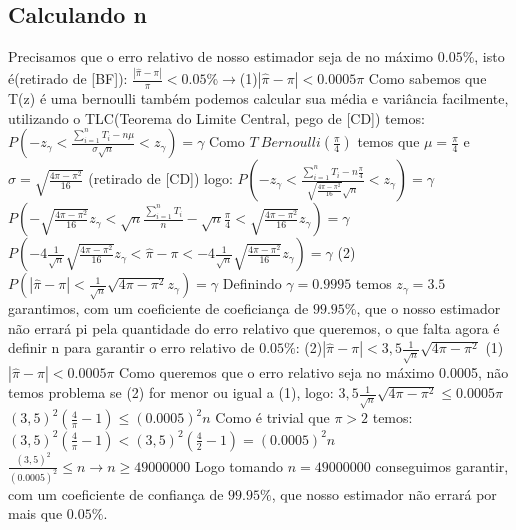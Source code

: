 \documentclass{article}
\begin{document}
\subsection{Calculando n}
Precisamos que o erro relativo de nosso estimador seja de no máximo $0.05\%$, isto é(retirado de [BF]):
\newline
$\frac{|\hat{\pi}-\pi|}{\pi}<0.05\%\rightarrow$(1)$|\hat{\pi}-\pi|<0.0005\pi$
\newline
Como sabemos que T(z) é uma bernoulli também podemos calcular sua média e variância facilmente, utilizando o TLC(Teorema do Limite Central, pego de [CD]) temos:
\newline
$P(-z_\gamma<\frac{\sum_{i=1}^{n}T_i-n\mu}{\sigma\sqrt{n}}<z_\gamma)=\gamma$
\newline
Como $T~Bernoulli(\frac{\pi}{4})$ temos que $\mu=\frac{\pi}{4}$ e $\sigma=\sqrt{\frac{4\pi-\pi^2}{16}}$ (retirado de [CD]) logo:
\newline
$P(-z_\gamma<\frac{\sum_{i=1}^{n}T_i-n\frac{\pi}{4}}{\sqrt{\frac{4\pi-\pi^2}{16}}\sqrt{n}}<z_\gamma)=\gamma$
\newline
$P(-\sqrt{\frac{4\pi-\pi^2}{16}}z_\gamma<\sqrt{n}\frac{\sum_{i=1}^{n}T_i}{n}-\sqrt{n}\frac{\pi}{4}<\sqrt{\frac{4\pi-\pi^2}{16}}z_\gamma)=\gamma$
\newline
$P(-4\frac{1}{\sqrt{n}}\sqrt{\frac{4\pi-\pi^2}{16}}z_\gamma<\hat{\pi}-\pi<-4\frac{1}{\sqrt{n}}\sqrt{\frac{4\pi-\pi^2}{16}}z_\gamma)=\gamma$
\newline
(2)$P(|\hat{\pi}-\pi|<\frac{1}{\sqrt{n}}\sqrt{4\pi-\pi^2}z_\gamma)=\gamma$
\newline
Definindo $\gamma=0.9995$ temos $z_\gamma=3.5$ garantimos, com um coeficiente de coeficiança de $99.95\%$, que o nosso estimador não errará pi pela quantidade do erro relativo que queremos, o que falta agora é definir n para garantir o erro relativo de $0.05\%$:
\newline
(2)$|\hat{\pi}-\pi|<3,5\frac{1}{\sqrt{n}}\sqrt{4\pi-\pi^2}$
\newline
(1)$|\hat{\pi}-\pi|<0.0005\pi$
\newline
Como queremos que o erro relativo seja no máximo 0.0005, não temos problema se (2) for menor ou igual a (1), logo:
\newline
$3,5\frac{1}{\sqrt{n}}\sqrt{4\pi-\pi^2}\le0.0005\pi$
\newline
$(3,5)^2(\frac{4}{\pi}-1)\le(0.0005)^2n$
\newline
Como é trivial que $\pi>2$ temos:
\newline
$(3,5)^2(\frac{4}{\pi}-1)<(3,5)^2(\frac{4}{2}-1)=(0.0005)^2n$
\newline
$\frac{(3,5)^2}{(0.0005)^2}\le n\rightarrow n\ge 49000000$
\newline
Logo tomando $n=49000000$ conseguimos garantir, com um coeficiente de confiança de $99.95\%$, que nosso estimador não errará por mais que $0.05\%$.
\end{document}
